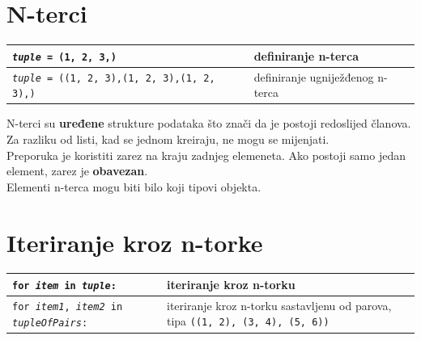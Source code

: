 \documentclass[10pt]{article}
\begin{document}
    \section*{\color{NavyBlue} N-terci}
    \begin{tabular}{|>{\tt}p{9.00cm}|>{}p{15.50cm}|}
        \hline
        \textit{tuple} = (1, 2, 3,) & definiranje n-terca
        \\ \hline
        \textit{tuple} = ((1, 2, 3),(1, 2, 3),(1, 2, 3),) & definiranje ugniježđenog n-terca
        \\ \hline
    \end{tabular}
    \begin{center}
        \footnotesize
        N-terci su \textbf{uređene} strukture podataka što znači da je postoji redoslijed članova. \\
        Za razliku od listi, kad se jednom kreiraju, ne mogu se mijenjati. \\
        Preporuka je koristiti zarez na kraju zadnjeg elemeneta. Ako postoji samo jedan element, zarez je \textbf{obavezan}. \\
        Elementi n-terca mogu biti bilo koji tipovi objekta. \\
    \end{center}

    \section*{\color{NavyBlue} Iteriranje kroz n-torke}
    \begin{tabular}{|>{\tt}p{9.00cm}|>{}p{15.50cm}|}
        \hline
        for \textit{item} in \textit{tuple}: & iteriranje kroz n-torku
        \\ \hline
        for \textit{item1}, \textit{item2} in \textit{tupleOfPairs}: & iteriranje kroz n-torku sastavljenu od parova, tipa \texttt{((1, 2), (3, 4), (5, 6))}
        \\ \hline
    \end{tabular}
\end{document}
